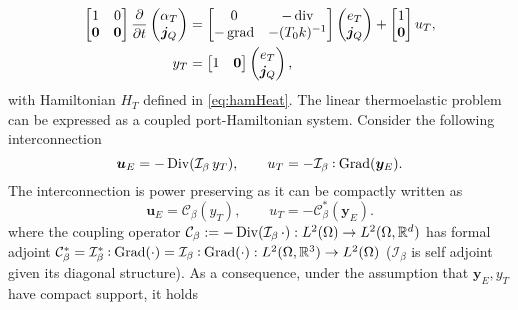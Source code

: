 \begin{equation}
\begin{aligned}
\begin{bmatrix}
1 & 0 \\
\bm{0} & \bm{0} \\
\end{bmatrix}
\diffp{}{t}
\begin{pmatrix}
\alpha_T \\
\bm{j}_Q \\
\end{pmatrix} &= 
\begin{bmatrix}
0 & -\div \\
-\grad & -(T_0 k)^{-1} \\
\end{bmatrix}
\begin{pmatrix}
e_T \\
\bm{j}_Q \\
\end{pmatrix} + 
\begin{bmatrix}
1 \\
\bm{0} \\
\end{bmatrix} u_T, \\
y_T &= \begin{bmatrix}
1 & \bm{0} \\
\end{bmatrix} \begin{pmatrix}
e_T \\
\bm{j}_Q \\
\end{pmatrix},
\end{aligned}
\end{equation} 
with Hamiltonian $H_T$ defined in \eqref{eq:hamHeat}. The linear thermoelastic problem can be expressed as a coupled port-Hamiltonian system.  Consider the following interconnection
\begin{equation}
\bm{u}_E = - \Div(\mathcal{I}_\beta \, y_T), \qquad
u_T = - \mathcal{I}_\beta \cddot\Grad(\bm{y}_E). 
\end{equation}
The interconnection is power preserving as it can be compactly written as 
\begin{equation*}
\bm{u}_E = \mathcal{C}_\beta(y_T), \qquad u_T = - \mathcal{C}_\beta^*(\bm{y}_E).
\end{equation*}
where the coupling operator $\mathcal{C}_\beta := - \operatorname*{Div}(\mathcal{I}_\beta \, \cdot) : L^2(\Omega) \rightarrow L^2(\Omega, \mathbb{R}^d)$ has formal adjoint $ \mathcal{C}_\beta^* =  \mathcal{I}_\beta^* \cddot  \Grad(\cdot) =  \mathcal{I}_\beta \cddot  \Grad(\cdot): L^2(\Omega, \mathbb{R}^3) \rightarrow L^2(\Omega)$ ($\mathcal{I}_\beta$ is self adjoint given its diagonal structure). As a consequence, under the assumption that $\bm{y}_E, y_T$ have compact support, it holds
